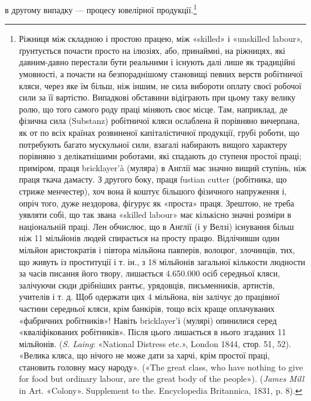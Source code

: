 в другому випадку — процесу ювелірної продукції.\footnote{
Ріжниця між складною і простою працею, між «skilled» і «unskilled
labour», ґрунтується почасти просто на ілюзіях, або, принаймні,
на ріжницях, які давним-давно перестали бути реальними і існують далі
лише як традиційні умовності, а почасти на безпораднішому становищі
певних верств робітничої кляси, через яке їм більш, ніж іншим, не сила
вибороти оплату своєї робочої сили за її вартістю. Випадкові обставини
відіграють при цьому таку велику ролю, що того самого роду праці міняють
своє місце. Там, наприклад, де фізична сила (Substanz) робітничої кляси
ослаблена й порівняно вичерпана, як от по всіх країнах розвиненої капіталістичної
продукції, грубі роботи, що потребують багато мускульної сили,
взагалі набирають вищого характеру порівняно з делікатнішими роботами,
які спадають до ступеня простої праці; приміром, праця bricklayer’à (муляра)
в Англії має значно вищий ступінь, ніж праця ткача дамасту.
З другого боку, праця fustian cutter (робітника, що стриже менчестер),
хоч вона й коштує більшого фізичного напруження і, опріч того, дуже нездорова,
фігурує як «проста» праця. Зрештою, не треба уявляти собі, що
так звана «skilled labour» має кількісно значні розміри в національній
праці. Лен обчислює, що в Англії (і у Велзі) існування більш ніж
11 мільйонів людей спирається на просту працю. Відлічивши один мільйон
аристократів і півтора мільйона павперів, волоцюг, злочинців, тих, що
живуть із проституції і т. ін., з 18 мільйонів загальної кількости людности
за часів писання його твору, лишається \num{4.650.000} осіб середньої
кляси, залічуючи сюди дрібніших рантьє, урядовців, письменників,
артистів, учителів і т. д. Щоб одержати цих 4 мільйона, він залічує до
працівної частини середньої кляси, крім банкірів, тощо всіх краще оплачуваних
«фабричних робітників»! Навіть bricklayer’і (мулярі) опинилися
серед «кваліфікованих робітників». Після цього лишається в нього
згаданих 11 мільйонів. (\emph{S. Laing}: «National Distress etc.», London
1844, стор. 51, 52). «Велика кляса, що нічого не може дати за харчі,
крім простої праці, становить головну масу народу». («The great class,
who have nothing to give for food but ordinary labour, are the great body
of the people»). (\emph{James Mill} in Art. «Colony». Supplement to the. Encyclopedia
Britannica, 1831, p. 8).
}

